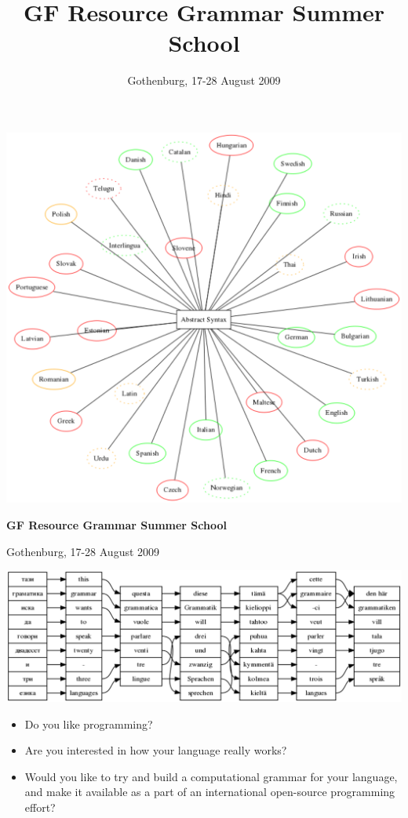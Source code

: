 \documentclass[11pt]{article}
\title{GF Resource Grammar Summer School}
\author{Gothenburg, 17-28 August 2009}
\begin{document}
\begin{center}
\includegraphics{summer-langs.png}

\vspace{3mm}

{\Large\bf GF Resource Grammar Summer School}

\vspace{2mm}

Gothenburg, 17-28 August 2009

\vspace{3mm}

\includegraphics{summer-align.png}
\end{center}

\newpage

\begin{itemize}
\item Do you like programming? 
\item Are you interested in how your language really works? 
\item Would you like to try and build a computational grammar for your language, 
  and make it available as a part of an international open-source 
  programming effort? 
\end{itemize}
\end{document}
